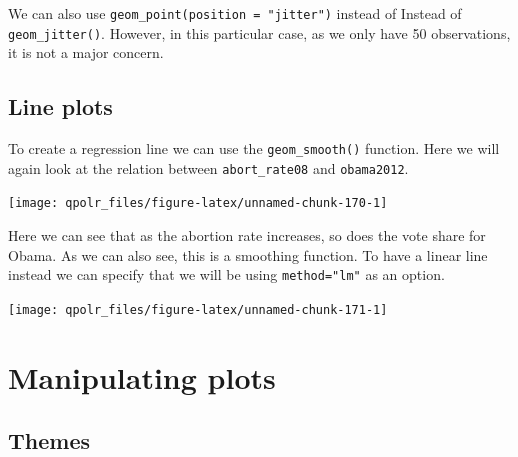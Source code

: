\documentclass[12pt,oneside]{reedthesis}
\theoremstyle{definition}
\theoremstyle{definition}
\theoremstyle{definition}
\theoremstyle{remark}
\begin{document}
  We can also use \texttt{geom\_point(position\ =\ "jitter")} instead of
  Instead of \texttt{geom\_jitter()}. However, in this particular case, as
  we only have 50 observations, it is not a major concern.
  
  \subsection{Line plots}\label{line-plots}
  
  To create a regression line we can use the \texttt{geom\_smooth()}
  function. Here we will again look at the relation between
  \texttt{abort\_rate08} and \texttt{obama2012}.
  \begin{Shaded}
  \begin{Highlighting}[]
  \NormalTok{(}\OperatorTok{+}
  \StringTok{  }\NormalTok{()}
  \end{Highlighting}
  \end{Shaded}
  \begin{center}\texttt{[image: qpolr\_files/figure-latex/unnamed-chunk-170-1]} \end{center}
  
  Here we can see that as the abortion rate increases, so does the vote
  share for Obama. As we can also see, this is a smoothing function. To
  have a linear line instead we can specify that we will be using
  \texttt{method="lm"} as an option.
  \begin{Shaded}
  \begin{Highlighting}[]
  \NormalTok{(}\OperatorTok{+}
  \StringTok{  }\NormalTok{(}\NormalTok{)}
  \end{Highlighting}
  \end{Shaded}
  \begin{center}\texttt{[image: qpolr\_files/figure-latex/unnamed-chunk-171-1]} \end{center}
  
  \section{Manipulating plots}\label{manipulating-plots}
  
  \subsection{Themes}\label{themes}
  
\end{document}
